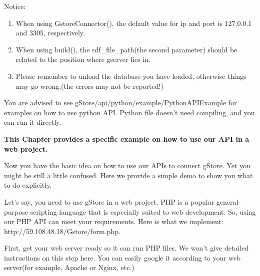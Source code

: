 \documentclass[titlepage, a4paper, 12pt]{article}
\begin{document}
	Notice:
	
	\begin{enumerate}
		\item
		When using GstoreConnector(), the default value for ip and port is
		127.0.0.1 and 3305, respectively.
		\item
		When using build(), the rdf\_file\_path(the second parameter) should
		be related to the position where gserver lies in.
		\item
		Please remember to unload the database you have loaded, otherwise
		things may go wrong.(the errors may not be reported!)
	\end{enumerate}
	
	
	You are advised to see gStore/api/python/example/PythonAPIExample for examples on how to use python API. Python file doesn't need compiling, and you can run it directly.

\clearpage

	
	\textbf{This Chapter provides a specific example on how to use our API in a web project.}
	
	
	Now you have the basic idea on how to use our APIs to connect gStore. Yet you might be still a little confused. Here we provide a simple demo to show you what to do explicitly.

	Let's say, you need to use gStore in a web project. PHP is a popular general-purpose scripting language that is especially suited to web development. So, using our PHP API can meet your requirements. Here is what we implement: http://59.108.48.18/Gstore/form.php.

	First, get your web server ready so it can run PHP files. We won't give detailed instructions on this step here. You can easily google it according to your web server(for example, Apache or Nginx, etc.) 
	
\end{document}
